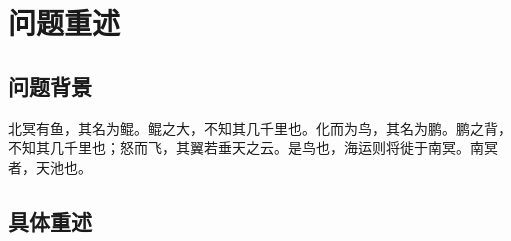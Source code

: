 
\section{问题重述}

\subsection{问题背景}

北冥有鱼，其名为鲲。鲲之大，不知其几千里也。化而为鸟，其名为鹏。鹏之背，不知其几千里也；怒而飞，其翼若垂天之云。是鸟也，海运则将徙于南冥。南冥者，天池也。

\subsection{具体重述}

\zhlipsum[3]


